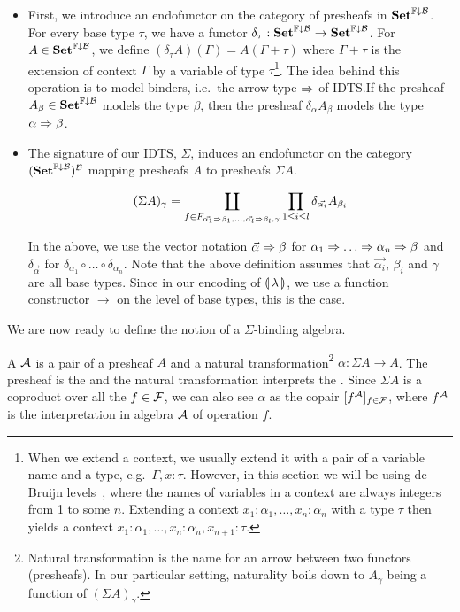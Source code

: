 \begin{itemize}
\item First, we introduce an endofunctor on the category of presheafs in
  $\mathbf{Set}^{\mathbb{F}\downarrow\mathcal{B}}$. For every base type $\tau$, we have a functor
  $\delta_\tau : \mathbf{Set}^{\mathbb{F}\downarrow\mathcal{B}} \to \mathbf{Set}^{\mathbb{F}\downarrow\mathcal{B}}$. For
  $A \in \mathbf{Set}^{\mathbb{F}\downarrow\mathcal{B}}$, we define
  $(\delta_\tau A)(\Gamma) = A(\Gamma + \tau)$ where $\Gamma + \tau$ is the
  extension of context $\Gamma$ by a variable of type $\tau$\footnote{When
    we extend a context, we usually extend it with a pair of a variable
    name and a type, e.g.\ $\Gamma, x : \tau$. However, in this section we
    will be using de Bruijn levels~\cite{de1972lambda}, where the names of
    variables in a context are always integers from 1 to some
    $n$. Extending a context $x_1 : \alpha_1, \ldots, x_n : \alpha_n$ with
    a type $\tau$ then yields a context
    $x_1 : \alpha_1, \ldots, x_n : \alpha_n, x_{n+1} : \tau$.}. The idea
  behind this operation is to model binders, i.e.\ the arrow type $\Rightarrow$ of
  IDTS.\@ If the presheaf $A_\beta \in \mathbf{Set}^{\mathbb{F}\downarrow\mathcal{B}}$ models the type
  $\beta$, then the presheaf $\delta_\alpha A_\beta$ models the type
  $\alpha \Rightarrow \beta$.

\item The signature of our IDTS, $\Sigma$, induces an endofunctor on the
  category $(\mathbf{Set}^{\mathbb{F}\downarrow\mathcal{B}})^{\mathcal{B}}$ mapping presheafs $A$ to presheafs
  $\Sigma A$.

  $$
  (\Sigma A)_\gamma = \coprod_{f \in F_{\vec{\alpha_1} \Rightarrow \beta_1, \ldots, \vec{\alpha_l} \Rightarrow \beta_l, \gamma}} \prod_{1 \le i \le l} \delta_{\vec{\alpha_i}} A_{\beta_i}
  $$

  In the above, we use the vector notation $\vec{\alpha} \Rightarrow \beta$ for
  $\alpha_1 \Rightarrow \ldots \Rightarrow \alpha_n \Rightarrow \beta$ and $\delta_{\vec{\alpha}}$
  for $\delta_{\alpha_1} \circ \ldots \circ \delta_{\alpha_n}$. Note that
  the above definition assumes that $\vec{\alpha_i}$, $\beta_i$ and
  $\gamma$ are all base types. Since in our encoding of $\llparenthesis \, \lambda \, \rrparenthesis$,
  we use a function constructor $\to$ on the level of base types, this is
  the case.
\end{itemize}

We are now ready to define the notion of a $\Sigma$-binding algebra.

\begin{definition}
  A  $\mathcal{A}$ is a pair of a presheaf $A$
  and a natural transformation\footnote{Natural transformation is the name
    for an arrow between two functors (presheafs). In our particular
    setting, naturality boils down to $A_\gamma$ being a function of
    $(\Sigma A)_\gamma$.} $\alpha : \Sigma A \to A$. The presheaf is the
   and the natural transformation interprets the
  . Since $\Sigma A$ is a coproduct over all the
  $f \in \mathcal{F}$, we can also see $\alpha$ as the copair
  $[f^{\mathcal{A}}]_{f \in \mathcal{F}}$, where $f^{\mathcal{A}}$ is the interpretation in algebra
  $\mathcal{A}$ of operation $f$.
\end{definition}

